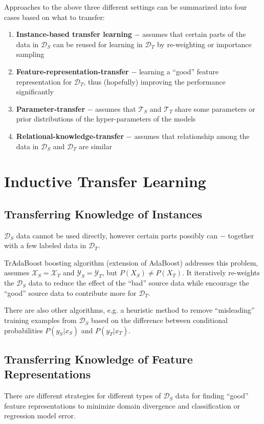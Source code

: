 \documentclass[a4paper,twocolumn]{article}
\newcommand{\D}{\mathcal{D}}
\newcommand{\T}{\mathcal{T}}
\newcommand{\X}{\mathcal{X}}
\newcommand{\Y}{\mathcal{Y}}
\begin{document}
Approaches to the above three different settings can be summarized into four cases based on what to transfer:

\begin{enumerate}
    \item \textbf{Instance-based transfer learning} $-$ assumes that certain parts of the data in $\D_S$ can be reused for learning in $\D_T$ by re-weighting or importance sampling
    \item \textbf{Feature-representation-transfer} $-$ learning a ``good'' feature representation for $\D_T$, thus (hopefully) improving the performance significantly
    \item \textbf{Parameter-transfer} $-$ assumes that $\T_S$ and $\T_T$ share some parameters or prior distributions of the hyper-parameters of the models
    \item \textbf{Relational-knowledge-transfer} $-$ assumes that relationship among the data in $\D_S$ and $\D_T$ are similar
\end{enumerate}

\section{Inductive Transfer Learning}
\subsection{Transferring Knowledge of Instances}
$\D_S$ data cannot be used directly, however certain parts possibly can $-$ together with a few labeled data in $\D_T$.

TrAdaBoost boosting algorithm (extension of AdaBoost) addresses this problem, assumes $\X_S = \X_T$ and $\Y_S = \Y_T$, but $P(X_S) \ne P(X_T)$. It iteratively re-weights the $\D_S$ data to reduce the effect of the ``bad'' source data while encourage the ``good'' source data to contribute more for $\D_T$.

There are also other algorithms, e.g. a heuristic method to remove ``misleading'' training examples from $\D_S$ based on the difference between conditional probabilities $P(y_S|x_S)$ and $P(y_T|x_T)$.

\subsection{Transferring Knowledge of Feature Representations}
There are different strategies for different types of $\D_S$ data for finding ``good'' feature representations to minimize domain divergence and classification or regression model error.
\end{document}
